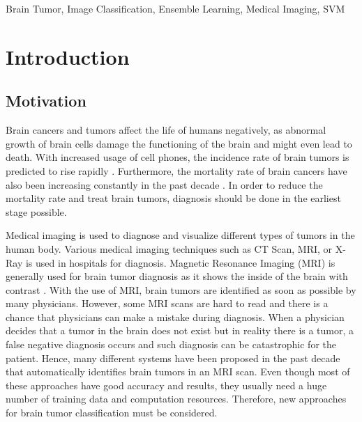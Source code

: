 \documentclass[conference]{IEEEtran}
\begin{document}
\begin{IEEEkeywords}
Brain Tumor, Image Classification, Ensemble Learning, Medical Imaging, SVM
\end{IEEEkeywords}

\section{Introduction}\label{intro}
\subsection{Motivation}
Brain cancers and tumors affect the life of humans negatively, as abnormal growth of brain cells damage the functioning of the brain and might even lead to death. With increased usage of cell phones, the incidence rate of brain tumors is predicted to rise rapidly \cite{b1}. Furthermore, the mortality rate of brain cancers have also been increasing constantly in the past decade \cite{b2}. In order to reduce the mortality rate and treat brain tumors, diagnosis should be done in the earliest stage possible. 

Medical imaging is used to diagnose and visualize different types of tumors in the human body. Various medical imaging techniques such as CT Scan, MRI, or X-Ray is used in hospitals for diagnosis. Magnetic Resonance Imaging (MRI) is generally used for brain tumor diagnosis as it shows the inside of the brain with contrast \cite{b7}. With the use of MRI, brain tumors are identified as soon as possible by many physicians. However, some MRI scans are hard to read and there is a chance that physicians can make a mistake during diagnosis. When a physician decides that a tumor in the brain does not exist but in reality there is a tumor, a false negative diagnosis occurs and such diagnosis can be catastrophic for the patient. Hence, many different systems have been proposed in the past decade that automatically identifies brain tumors in an MRI scan. Even though most of these approaches have good accuracy and results, they usually need a huge number of training data and computation resources. Therefore, new approaches for brain tumor classification must be considered. 
\end{document}
